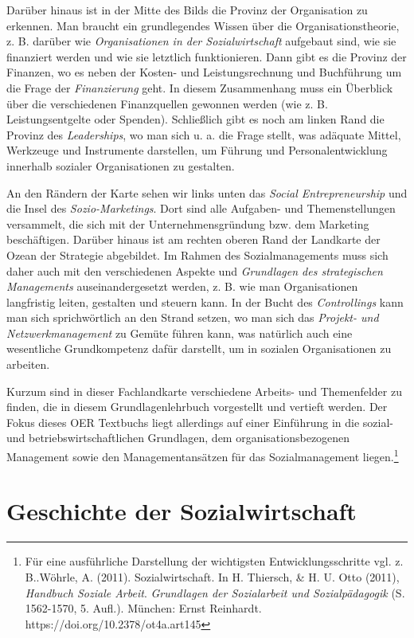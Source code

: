 \documentclass[
  letterpaper,
]{book}
\begin{document}
Darüber hinaus ist in der Mitte des Bilds die Provinz der Organisation
zu erkennen. Man braucht ein grundlegendes Wissen über die
Organisationstheorie, z. B. darüber wie \emph{Organisationen in der
Sozialwirtschaft} aufgebaut sind, wie sie finanziert werden und wie sie
letztlich funktionieren. Dann gibt es die Provinz der Finanzen, wo es
neben der Kosten- und Leistungsrechnung und Buchführung um die Frage der
\emph{Finanzierung} geht. In diesem Zusammenhang muss ein Überblick über
die verschiedenen Finanzquellen gewonnen werden (wie z. B.
Leistungsentgelte oder Spenden). Schließlich gibt es noch am linken Rand
die Provinz des \emph{Leaderships}, wo man sich u. a. die Frage stellt,
was adäquate Mittel, Werkzeuge und Instrumente darstellen, um Führung
und Personalentwicklung innerhalb sozialer Organisationen zu gestalten.

An den Rändern der Karte sehen wir links unten das \emph{Social
Entrepreneurship} und die Insel des \emph{Sozio-Marketings}. Dort sind
alle Aufgaben- und Themenstellungen versammelt, die sich mit der
Unternehmensgründung bzw. dem Marketing beschäftigen. Darüber hinaus ist
am rechten oberen Rand der Landkarte der Ozean der Strategie abgebildet.
Im Rahmen des Sozialmanagements muss sich daher auch mit den
verschiedenen Aspekte und \emph{Grundlagen des strategischen
Managements} auseinandergesetzt werden, z. B. wie man Organisationen
langfristig leiten, gestalten und steuern kann. In der Bucht des
\emph{Controllings} kann man sich sprichwörtlich an den Strand setzen,
wo man sich das \emph{Projekt- und Netzwerkmanagement} zu Gemüte führen
kann, was natürlich auch eine wesentliche Grundkompetenz dafür
darstellt, um in sozialen Organisationen zu arbeiten.

Kurzum sind in dieser Fachlandkarte verschiedene Arbeits- und
Themenfelder zu finden, die in diesem Grundlagenlehrbuch vorgestellt und
vertieft werden. Der Fokus dieses OER Textbuchs liegt allerdings auf
einer Einführung in die sozial- und betriebswirtschaftlichen Grundlagen,
dem organisationsbezogenen Management sowie den Managementansätzen für
das Sozialmanagement liegen.\footnote{Für eine ausführliche Darstellung
  der wichtigsten Entwicklungsschritte vgl. z. B..Wöhrle, A. (2011).
  Sozialwirtschaft. In H. Thiersch, \& H. U. Otto (2011), \emph{Handbuch
  Soziale Arbeit}. \emph{Grundlagen der Sozialarbeit und
  Sozialpädagogik} (S. 1562-1570, 5. Aufl.). München: Ernst Reinhardt.
  https://doi.org/10.2378/ot4a.art145}

\chapter{Geschichte der Sozialwirtschaft}\label{geschichte}
\end{document}
